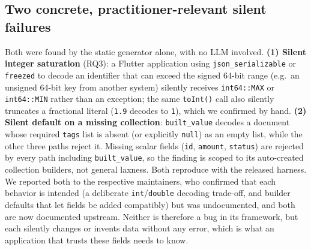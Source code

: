 \subsection{Two concrete, practitioner-relevant silent failures}
\label{sec:evaluation-defects}
Both were found by the static generator alone, with no LLM involved.
\textbf{(1) Silent integer saturation} (RQ3): a Flutter application using
\texttt{json\_serializable} or \texttt{freezed} to decode an identifier that
can exceed the signed 64-bit range (e.g.\ an unsigned 64-bit key from another system) silently
receives \texttt{int64::MAX} or \texttt{int64::MIN} rather than an
exception; the same \texttt{toInt()} call also silently truncates a
fractional literal (\texttt{1.9} decodes to \texttt{1}), which we confirmed
by hand. \textbf{(2) Silent default on a missing collection}:
\texttt{built\_value} decodes a document whose required \texttt{tags} list is
absent (or explicitly \texttt{null}) as an empty list, while the other three
paths reject it. Missing scalar fields (\texttt{id}, \texttt{amount},
\texttt{status}) are rejected by every path including \texttt{built\_value},
so the finding is scoped to its auto-created collection builders, not
general laxness. Both reproduce with the released harness. We reported both
to the respective maintainers, who confirmed that each behavior is intended
(a deliberate \texttt{int}/\texttt{double} decoding trade-off, and
builder defaults that let fields be added compatibly) but was
undocumented, and both are now documented upstream. Neither is therefore a
bug in its framework, but each silently changes or invents data without
any error, which is what an application that trusts these fields needs to
know.
